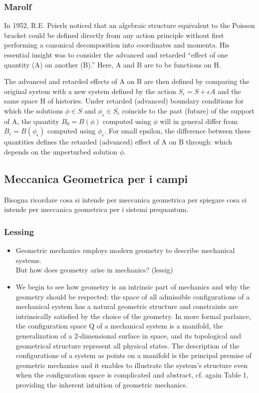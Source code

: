 \documentclass[Main]{subfiles}
\begin{document}
		\subsubsection{Marolf}
			In 1952, R.E. Peierls noticed that an algebraic structure equivalent to the Poisson bracket could be defined directly from any action principle without first performing a canonical decomposition into coordinates and momenta. 
			His essential insight was to consider the advanced and retarded “effect of one quantity (A) on another (B).” Here, A and B are to
be functions on H. 

			The advanced  and retarded  effects of A on B are then defined by comparing the original system with a new system defined by the action $S_\epsilon = S + \epsilon A$ and the same space H of histories. 
			Under retarded (advanced) boundary conditions for which the solutions $\phi \in S$ and $\phi_\epsilon	\in S_\epsilon$ coincide to the past (future) of the support of A, the quantity $B_0 = B(\phi)$ computed using $\phi$ will in general differ from $B_\epsilon = B(\phi_\epsilon)$ computed using $\phi_\epsilon$.
			For small epsilon, the difference between these quantities defines the retarded (advanced) effect of A on B through:
which depends on the unperturbed solution $\phi$.

	\subsection{Meccanica Geometrica per i campi}
		Bisogna ricordare cosa si intende per meccanica geometrica per spiegare cosa si intende per meccanica geometrica per i sistemi prequantum.
	
	 	\subsubsection{Lessing}
			\begin{itemize}
				\item Geometric mechanics employs modern geometry to describe mechanical systems.\\
					But how does geometry arise in mechanics?  (lessig)
				\item We begin to see how geometry is an intrinsic part of mechanics and why the geometry should be respected: the space of all admissible configurations of a mechanical system has a natural geometric structure and constraints are intrinsically satisfied by the choice of the geometry. 
				In more formal parlance, the configuration space Q of a mechanical system is a manifold, the generalization of a 2-dimensional surface in space, and its topological and geometrical structure represent all physical states.
				The description of the configurations of a system as points on a manifold is the principal premise of geometric mechanics and it enables to illustrate the system’s structure even when the configuration space is complicated and abstract, cf. again Table 1, providing the inherent intuition of geometric mechanics.
			\end{itemize}
			
\end{document}
